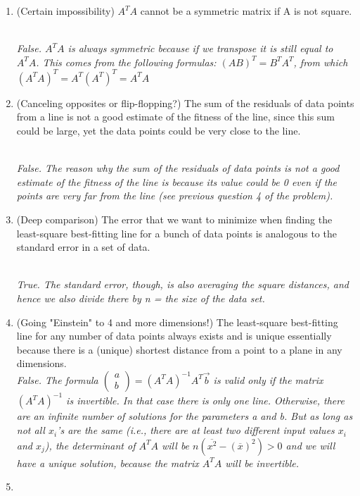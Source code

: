 \documentclass [11pt, letterpaper] {amsart}
\theoremstyle{plain}
\theoremstyle{definition}
\begin{document}
\vspace{0.05in}







\begin{enumerate}
    \item (Certain impossibility) $A^TA$  cannot be a symmetric matrix if A  is not square.
                    
\\
    \emph{False. $A^TA$ is always symmetric because if we transpose it is still equal to $A^TA$. This comes from the following formulas: $(AB)^T=B^TA^T$, from which $(A^TA)^T=A^T(A^T)^T= A^TA$}\\\item 
    (Canceling opposites or flip-flopping?) The sum of the residuals of data points from a line is not a good estimate of the fitness of the line, since this sum could be large, yet the data points could be very close to the line.
                    
\\
    \emph{False. The reason why the sum of the residuals of data points is not a good estimate of the fitness of the line is because its value could be 0 even if the points are very far from the line (see previous question 4 of the problem).}\\
    \item 
        (Deep comparison) The error that we want to minimize when finding the least-square best-fitting line for a bunch of data points is analogous to the standard error in a set of data.
                    
\\
    \emph{True. The standard error, though, is also averaging the square distances, and hence we also divide there by n = the size of the data set.}\\\item 
                        (Going "Einstein" to 4 and more dimensions!) The least-square best-fitting line for any number of data points  always exists and is unique essentially because there is a (unique) shortest distance from a point to a plane in any dimensions.
\\
    \emph{False. The formula $\left(\begin{matrix}
                    a\\
                    b
                  \end{matrix}\right) = (A^TA)^{-1}A^T\vec{b}$ is valid only if the matrix $(A^TA)^{-1}$ is invertible. In that case there is only one line. Otherwise, there are an infinite number of solutions for the parameters a and b. But as long as not all $x_i$'s are the same (i.e., there are at least two different input values $x_i$ and $x_j$), the determinant of  $A^TA$ will be $n(\overline{x^2}-(\overline{x})^2)>0$ and we will have a unique solution, because the matrix $A^TA$ will be invertible.}\\\item 
                    

\end{enumerate}
\end{document}
